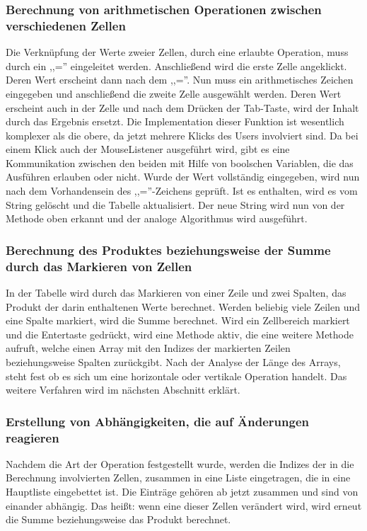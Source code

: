 \documentclass[12pt]{report}
\begin{document}
\subsubsection{Berechnung von arithmetischen Operationen zwischen verschiedenen Zellen}
Die Verknüpfung der Werte zweier Zellen, durch eine erlaubte Operation, muss durch ein ,,='' eingeleitet werden. Anschließend wird die erste Zelle angeklickt. Deren Wert erscheint dann nach dem ,,=''. Nun muss ein arithmetisches Zeichen eingegeben und anschließend die zweite Zelle ausgewählt werden. Deren Wert erscheint auch in der Zelle und nach dem Drücken der Tab-Taste, wird der Inhalt durch das Ergebnis ersetzt. Die Implementation dieser Funktion ist wesentlich komplexer als die obere, da jetzt mehrere Klicks des Users involviert sind. Da bei einem Klick auch der MouseListener ausgeführt wird, gibt es eine Kommunikation zwischen den beiden mit Hilfe von boolschen Variablen, die das Ausführen erlauben oder nicht. Wurde der Wert vollständig eingegeben, wird nun nach dem Vorhandensein des ,,=''-Zeichens geprüft. Ist es enthalten, wird es vom String gelöscht und die Tabelle aktualisiert. Der neue String wird nun von der Methode oben erkannt und der analoge Algorithmus wird ausgeführt.


\subsubsection{Berechnung des Produktes beziehungsweise der Summe durch das Markieren von Zellen}
In der Tabelle wird durch das Markieren von einer Zeile und zwei Spalten, das Produkt der darin enthaltenen Werte berechnet. Werden beliebig viele Zeilen und eine Spalte markiert, wird die Summe berechnet. Wird ein Zellbereich markiert und die Entertaste gedrückt, wird eine Methode aktiv, die eine weitere Methode aufruft, welche einen Array mit den Indizes der markierten Zeilen beziehungsweise Spalten zurückgibt. Nach der Analyse der Länge des Arrays, steht fest ob es sich um eine horizontale oder vertikale Operation handelt. Das weitere Verfahren wird im nächsten Abschnitt erklärt. 


\subsubsection{Erstellung von Abhängigkeiten, die auf Änderungen reagieren}
Nachdem die Art der Operation festgestellt wurde, werden die Indizes der in die Berechnung involvierten Zellen, zusammen in eine Liste eingetragen, die in eine Hauptliste eingebettet ist. Die Einträge gehören ab jetzt zusammen und sind von einander abhängig. Das heißt: wenn eine dieser Zellen verändert wird, wird erneut die Summe beziehungsweise das Produkt berechnet.
\end{document}

